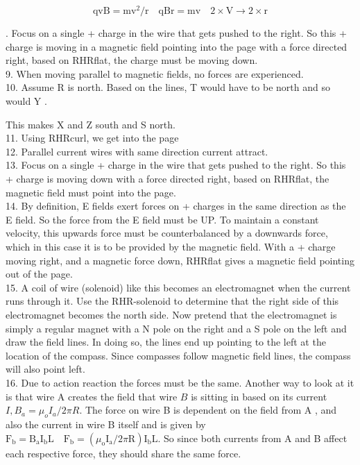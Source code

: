 \begin{enumerate}
$$
\mathrm{qvB}=\mathrm{mv}^{2} / \mathrm{r} \quad \mathrm{qBr}=\mathrm{mv} \quad 2 \times \mathrm{V} \rightarrow 2 \times \mathrm{r}
$$

. Focus on a single + charge in the wire that gets pushed to the right. So this + charge is moving in a magnetic field pointing into the page with a force directed right, based on RHRflat, the charge must be moving down.\\
9. When moving parallel to magnetic fields, no forces are experienced.\\
10. Assume R is north. Based on the lines, T would have to be north and so would Y .

This makes X and Z south and S north.\\
11. Using RHRcurl, we get into the page\\
12. Parallel current wires with same direction current attract.\\
13. Focus on a single + charge in the wire that gets pushed to the right. So this + charge is moving down with a force directed right, based on RHRflat, the magnetic field must point into the page.\\
14. By definition, E fields exert forces on + charges in the same direction as the E field. So the force from the E field must be UP. To maintain a constant velocity, this upwards force must be counterbalanced by a downwards force, which in this case it is to be provided by the magnetic field. With a + charge moving right, and a magnetic force down, RHRflat gives a magnetic field pointing out of the page.\\
15. A coil of wire (solenoid) like this becomes an electromagnet when the current runs through it. Use the RHR-solenoid to determine that the right side of this electromagnet becomes the north side. Now pretend that the electromagnet is simply a regular magnet with a N pole on the right and a S pole on the left and draw the field lines. In doing so, the lines end up pointing to the left at the location of the compass. Since compasses follow magnetic field lines, the compass will also point left.\\
16. Due to action reaction the forces must be the same. Another way to look at it is that wire A creates the field that wire $B$ is sitting in based on its current $I, B_{a}=\mu_{o} I_{a} / 2 \pi R$. The force on wire B is dependent on the field from A , and also the current in wire B itself and is given by $\mathrm{F}_{\mathrm{b}}=\mathrm{B}_{\mathrm{a}} \mathrm{I}_{\mathrm{b}} \mathrm{L} \quad \mathrm{F}_{\mathrm{b}}=\left(\mu_{\mathrm{o}} \mathrm{I}_{\mathrm{a}} / 2 \pi \mathrm{R}\right) \mathrm{I}_{\mathrm{b}} \mathrm{L}$. So since both currents from A and B affect each respective force, they should share the same force.\\

\end{enumerate}
